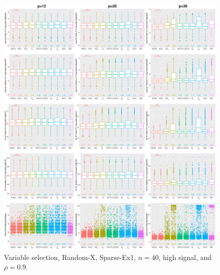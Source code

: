 \begin{figure}[!ht]
\centering
\includegraphics[width=\textwidth]{figures/supplement/randomx/subset_selection/Sparse-Ex1_n40_hsnr_rho09.eps}
\caption{Variable selection, Random-X, Sparse-Ex1, $n=40$, high signal, and $\rho=0.9$.}
\end{figure}
\clearpage
